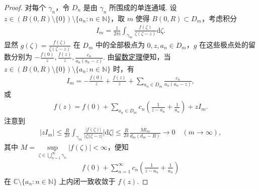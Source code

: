 \documentclass[../../main.tex]{subfiles}%
\begin{document}
\begin{proof}
对每个 \(\gamma_n\)，令 \(D_n\) 是由 \(\gamma_n\) 所围成的单连通域. 设 \(z \in (B(0, R) \setminus \{0\}) \setminus \{a_n : n \in \mathbb{N}\}\)，取 \(m\) 使得 \(B(0, R) \subset D_m\)，考虑积分
\begin{align*}
I_m = \frac{1}{2\pi \mathrm{i}} \int_{\gamma_m} \frac{f(\zeta)}{\zeta(\zeta-z)} \mathrm{d}\zeta.
\end{align*}
显然 \(g(\zeta) = \frac{f(\zeta)}{\zeta(\zeta-z)}\) 在 \(D_m\) 中的全部极点为 \(0, z, a_n \in D_m\)，\(g\) 在这些极点处的留数分别为 \(-\frac{f(0)}{z}, \frac{f(z)}{z}, \frac{c_n}{a_n(a_n-z)}\). 由\hyperref[theorem:留数定理(残数定理)-定理5.4.9]{留数定理}便知，当 \(z \in (B(0, R) \setminus \{0\}) \setminus \{a_n : n \in \mathbb{N}\}\) 时，有
\begin{align*}
I_m = -\frac{f(0)}{z} + \frac{f(z)}{z} + \sum_{a_n \in D_m} \frac{c_n}{a_n(a_n-z)},
\end{align*}
或
\begin{align*}
f(z) = f(0) + \sum_{a_n \in D_m} c_n \left( \frac{1}{z-a_n} + \frac{1}{a_n} \right) + z I_m.
\end{align*}
注意到
\begin{align*}
|z I_m| \leqslant \frac{R}{2\pi} \int_{\gamma_m} \frac{|f(\zeta)|}{|\zeta| |\zeta-z|} |\mathrm{d}\zeta| \leqslant \frac{R}{2\pi} \frac{M l_m}{d_m(d_m - R)} \to 0 \quad (m \to \infty),
\end{align*}
其中 \(M = \sup\limits_{\zeta \in \bigcup_{n=1}^\infty \gamma_n} |f(\zeta)| < \infty\)，便知
\begin{align*}
f(0) + \sum_{n=1}^\infty c_n \left( \frac{1}{z-a_n} + \frac{1}{a_n} \right)
\end{align*}
在 \(\mathbb{C} \setminus \{a_n : n \in \mathbb{N}\}\) 上内闭一致收敛于 \(f(z)\).
\end{proof}
\end{document}
